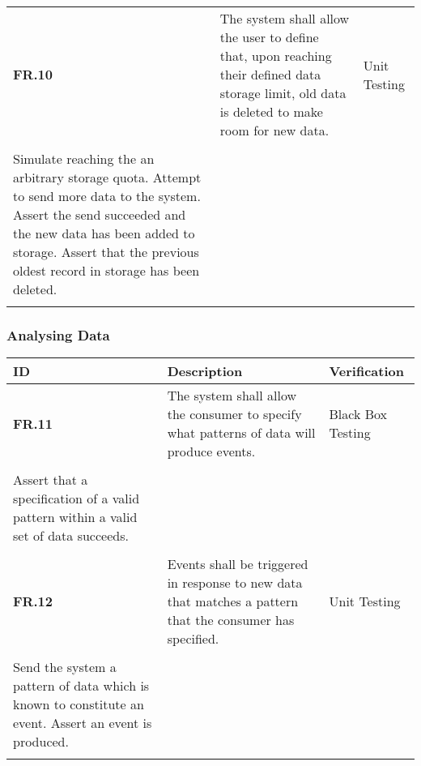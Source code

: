 \begin{table}
\begin{tabular}{|l|l|l|}
    	\textbf{FR.10} & The system shall allow the user to define that, upon reaching their defined data storage limit, old data is deleted to make room for new data. & Unit Testing\\\begin{itemize}\\\item Simulate reaching the an arbitrary storage quota. Attempt to send more data to the system. Assert the send succeeded and the new data has been added to storage. Assert that the previous oldest record in storage has been deleted.\\\end{itemize} \\ \hline
	\end{tabular}
\end{table}
\subsubsection{Analysing Data}
\begin{table}
    \begin{tabular}{|l|l|l|}
        \hline
        \textbf{ID}    & \textbf{Description}                                                                                      & \textbf{Verification}                                                                                                                                     \\ \hline
        \textbf{FR.11} & The system shall allow the consumer to specify what patterns of data will produce events.                 & Black Box Testing\\\begin{itemize}\\\item Assert that a specification of a valid pattern within a valid set of data succeeds.\\\end{itemize}              \\ \hline
        \textbf{FR.12} & Events shall be triggered in response to new data that matches a pattern that the consumer has specified. & Unit Testing\\\begin{itemize}\\\item Send the system a pattern of data which is known to constitute an event. Assert an event is produced.\\\end{itemize} \\ \hline
    \end{tabular}
\end{table}
